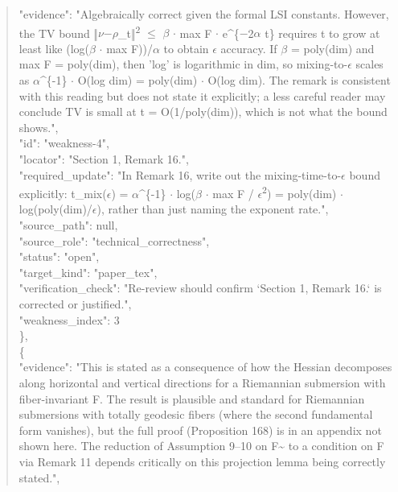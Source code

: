 \documentclass[11pt]{article}
\begin{document}
\begin{quote}
      "evidence": "Algebraically correct given the formal LSI constants. However, the TV bound ‖\ensuremath{\nu}\ensuremath{-}\ensuremath{\rho}\_t‖\textsuperscript{2} \ensuremath{\le} \ensuremath{\beta} \ensuremath{\cdot} max F \ensuremath{\cdot} e\^{}\{\ensuremath{-}2\ensuremath{\alpha} t\} requires t to grow at least like (log(\ensuremath{\beta} \ensuremath{\cdot} max F))/\ensuremath{\alpha} to obtain \ensuremath{\epsilon} accuracy. If \ensuremath{\beta} = poly(dim) and max F = poly(dim), then 'log' is logarithmic in dim, so mixing-to-\ensuremath{\epsilon} scales as \ensuremath{\alpha}\^{}\{-1\} \ensuremath{\cdot} O(log dim) = poly(dim) \ensuremath{\cdot} O(log dim). The remark is consistent with this reading but does not state it explicitly; a less careful reader may conclude TV is small at t = O(1/poly(dim)), which is not what the bound shows.",\\
      "id": "weakness-4",\\
      "locator": "Section 1, Remark 16.",\\
      "required\_update": "In Remark 16, write out the mixing-time-to-\ensuremath{\epsilon} bound explicitly: t\_mix(\ensuremath{\epsilon}) = \ensuremath{\alpha}\^{}\{-1\} \ensuremath{\cdot} log(\ensuremath{\beta} \ensuremath{\cdot} max F / \ensuremath{\epsilon}\textsuperscript{2}) = poly(dim) \ensuremath{\cdot} log(poly(dim)/\ensuremath{\epsilon}), rather than just naming the exponent rate.",\\
      "source\_path": null,\\
      "source\_role": "technical\_correctness",\\
      "status": "open",\\
      "target\_kind": "paper\_tex",\\
      "verification\_check": "Re-review should confirm `Section 1, Remark 16.` is corrected or justified.",\\
      "weakness\_index": 3\\
    \},\\
    \{\\
      "evidence": "This is stated as a consequence of how the Hessian decomposes along horizontal and vertical directions for a Riemannian submersion with fiber-invariant F. The result is plausible and standard for Riemannian submersions with totally geodesic fibers (where the second fundamental form vanishes), but the full proof (Proposition 168) is in an appendix not shown here. The reduction of Assumption 9--10 on F\~{} to a condition on F via Remark 11 depends critically on this projection lemma being correctly stated.",\\

\end{quote}
\end{document}
